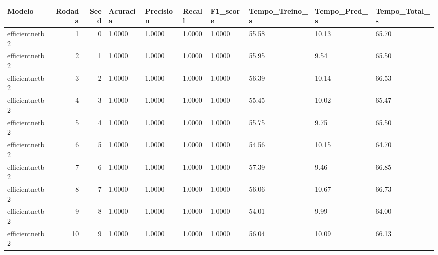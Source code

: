 \begin{tabular}{lrrlllllll}
\toprule
Modelo & Rodada & Seed & Acuracia & Precision & Recall & F1_score & Tempo_Treino_s & Tempo_Pred_s & Tempo_Total_s \\
\midrule
efficientnetb2 & 1 & 0 & 1.0000 & 1.0000 & 1.0000 & 1.0000 & 55.58 & 10.13 & 65.70 \\
efficientnetb2 & 2 & 1 & 1.0000 & 1.0000 & 1.0000 & 1.0000 & 55.95 & 9.54 & 65.50 \\
efficientnetb2 & 3 & 2 & 1.0000 & 1.0000 & 1.0000 & 1.0000 & 56.39 & 10.14 & 66.53 \\
efficientnetb2 & 4 & 3 & 1.0000 & 1.0000 & 1.0000 & 1.0000 & 55.45 & 10.02 & 65.47 \\
efficientnetb2 & 5 & 4 & 1.0000 & 1.0000 & 1.0000 & 1.0000 & 55.75 & 9.75 & 65.50 \\
efficientnetb2 & 6 & 5 & 1.0000 & 1.0000 & 1.0000 & 1.0000 & 54.56 & 10.15 & 64.70 \\
efficientnetb2 & 7 & 6 & 1.0000 & 1.0000 & 1.0000 & 1.0000 & 57.39 & 9.46 & 66.85 \\
efficientnetb2 & 8 & 7 & 1.0000 & 1.0000 & 1.0000 & 1.0000 & 56.06 & 10.67 & 66.73 \\
efficientnetb2 & 9 & 8 & 1.0000 & 1.0000 & 1.0000 & 1.0000 & 54.01 & 9.99 & 64.00 \\
efficientnetb2 & 10 & 9 & 1.0000 & 1.0000 & 1.0000 & 1.0000 & 56.04 & 10.09 & 66.13 \\
\bottomrule
\end{tabular}
